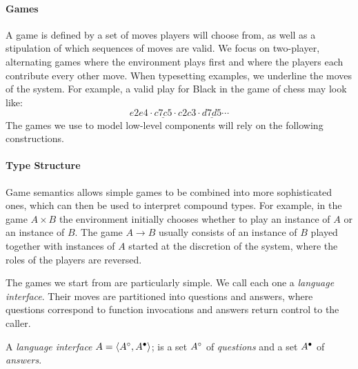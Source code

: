 
\vspace*{-2ex}
\paragraph{Games} \label{sec:mainideas:gs:games} %
A game is defined by a set of moves
players will choose from,
as well as a stipulation of which
sequences of moves are valid.
We focus on two-player, alternating games
where the environment plays first and
where the players
each contribute every other move.
When typesetting examples,
we underline the moves of the system.
For example, a valid play for Black in the game of chess may look like:
\[ e2e4 \cdot \underline{c7c5} \cdot c2c3 \cdot \underline{d7d5} \cdots \]
The games we use to model low-level components
will rely on the following constructions.


\vspace*{-2ex}
\paragraph{Type Structure} \label{sec:mainideas:gs:types} %
Game semantics allows
simple games to be combined into more sophisticated ones,
which can then be used
to interpret compound types.
For example,
in the game $A \times B$
the environment initially chooses whether to play
an instance of $A$ or an instance of $B$.
The game $A \rightarrow B$ usually consists of
an instance of $B$ played
together with instances of $A$
started at the discretion of the system,
where the roles of the players are reversed.

The games we start from are particularly simple. %
We call each one a \emph{language interface}.
Their moves are partitioned into
questions and answers,
where
questions correspond to function invocations
and answers return control to the caller.

\begin{definition} \label{def:li}
A \emph{language interface}
$A = \langle A^\circ, A^\bullet \rangle$;
is a set $A^\circ$ of \emph{questions} and
a set $A^\bullet$ of \emph{answers}.
\end{definition}

